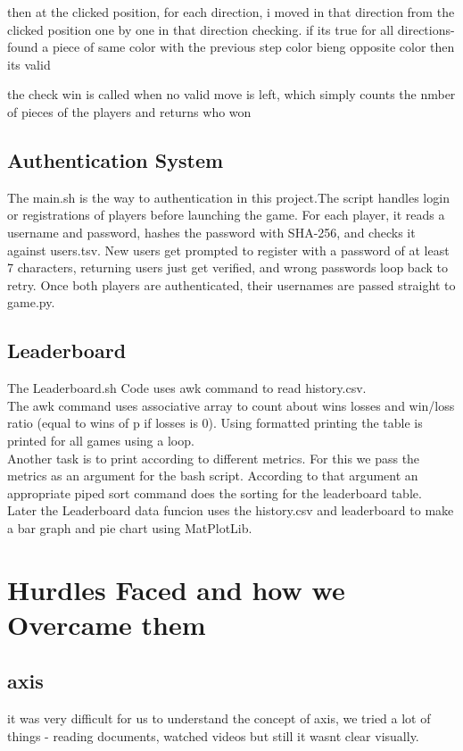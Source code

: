 \documentclass{article}
\begin{document}
then at the clicked position, for each direction, i moved in that direction from the clicked position one by one in that direction checking.
if its true for all directions- found a piece of same color with the previous step color bieng opposite color
then its valid

the check win is called when no valid move is left, which simply counts the nmber of pieces of the players and returns who won


\subsection{Authentication System}
The main.sh is the way to authentication in this project.The script handles login or registrations of players before launching the game. For each player, it reads a username and password, hashes the password with SHA-256, and checks it against users.tsv. New users get prompted to register with a password of at least 7 characters, returning users just get verified, and wrong passwords loop back to retry. Once both players are authenticated, their usernames are passed straight to game.py.
\subsection{Leaderboard}
The Leaderboard.sh Code uses awk command to read history.csv.\\ The awk command uses associative array to count about wins losses and win/loss ratio (equal to wins of p if losses is 0). Using formatted printing the table is printed for all games using a loop.\\  Another task is to print according to different metrics. For this we pass the metrics as an argument for the bash script. According to that argument an appropriate piped sort command does the sorting for the leaderboard table.\\
Later the Leaderboard data funcion uses the history.csv and leaderboard to make a bar graph and pie chart using MatPlotLib.

\clearpage

\section{Hurdles Faced and how we Overcame them}
\subsection{axis}
it was very difficult for us to understand the concept of axis, we tried a lot of things - reading documents, watched videos but still it wasnt clear visually.\\
\end{document}
